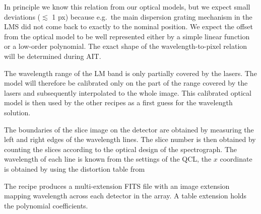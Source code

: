 In principle we know this relation from our optical models, but we expect small
deviations ($\lesssim$ 1 px) because e.g.\ the main dispersion grating mechanism
in the \ac{LMS} did not come back to exactly to the nominal position.
We expect the offset from the optical model to be well represented either by a
simple linear function or a low-order polynomial.
The exact shape of the wavelength-to-pixel relation will be determined during
\ac{AIT}.

The wavelength range of the LM band is only partially covered by the lasers.
The model will therefore be calibrated only on the part of the range covered by
the lasers and subsequently interpolated to the whole image.
This calibrated optical model is then used by the other recipes as a first
guess for the wavelength solution.

The boundaries of the slice image on the detector are obtained by
measuring the left and right edges of the wavelength lines.
The slice number is then obtained by counting the
slices according to the optical design of the spectrograph.
The wavelength of each line is known from the settings of the \ac{QCL}, the $x$
coordinate is obtained by
using the distortion table from 

The recipe produces a multi-extension FITS file with an image
extension mapping wavelength across each detector in the array.
A table extension holds the polynomial coefficients.


